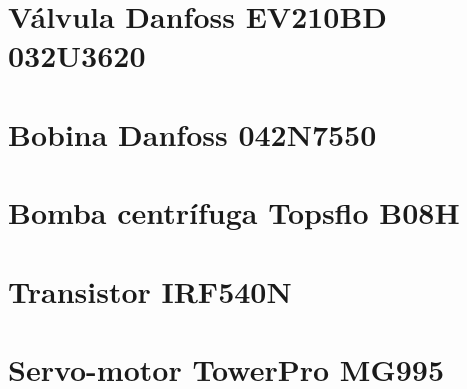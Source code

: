 
\chapter{V\'alvula Danfoss EV210BD 032U3620}
\label{Anexo3}





\chapter{Bobina Danfoss 042N7550}
\label{Anexo4}




\chapter{Bomba centr\'ifuga Topsflo B08H}
\label{Anexo5}




\chapter{Transistor IRF540N}
\label{Anexo6}




\chapter{Servo-motor TowerPro MG995}
\label{Anexo7}


